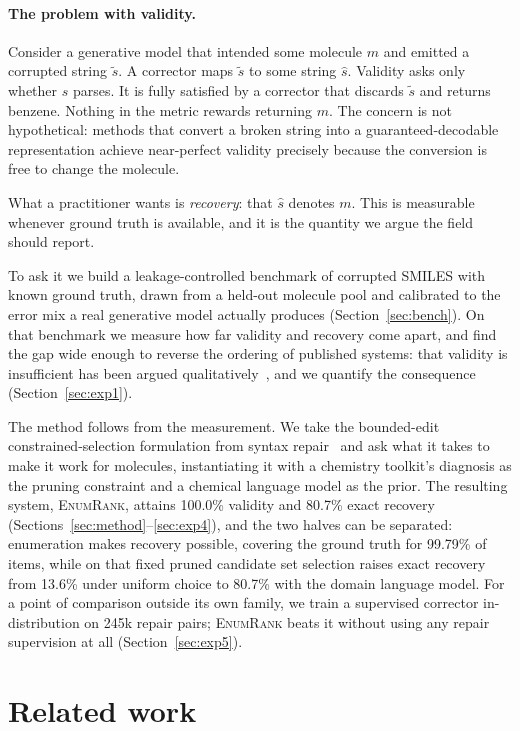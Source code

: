 \documentclass[journal=jcisd8,manuscript=article]{achemso}
\newcommand{\ours}{\textsc{EnumRank}}
\begin{document}
\paragraph{The problem with validity.}
Consider a generative model that intended some molecule $m$ and emitted a
corrupted string $\tilde{s}$. A corrector maps $\tilde{s}$ to some string
$\hat{s}$. Validity asks only whether $\hat{s}$ parses. It is fully satisfied by
a corrector that discards $\tilde{s}$ and returns benzene. Nothing in the metric
rewards returning $m$. The concern is not hypothetical: methods that convert a
broken string into a guaranteed-decodable representation achieve near-perfect
validity precisely because the conversion is free to change the molecule.

What a practitioner wants is \emph{recovery}: that $\hat{s}$ denotes $m$. This
is measurable whenever ground truth is available, and it is the quantity we
argue the field should report.

To ask it we build a leakage-controlled benchmark of corrupted SMILES with known
ground truth, drawn from a held-out molecule pool and calibrated to the error mix
a real generative model actually produces (Section~\ref{sec:bench}). On that
benchmark we measure how far validity and recovery come apart, and find the gap
wide enough to reverse the ordering of published systems: that validity is
insufficient has been argued qualitatively~\citep{amrec}, and we quantify the
consequence (Section~\ref{sec:exp1}).

The method follows from the measurement. We take the bounded-edit
constrained-selection formulation from syntax repair~\citep{considine2025syntax}
and ask what it takes to make it work for molecules, instantiating it with a
chemistry toolkit's diagnosis as the pruning constraint and a chemical language
model as the prior. The resulting system, \ours{}, attains 100.0\% validity and
80.7\% exact recovery (Sections~\ref{sec:method}--\ref{sec:exp4}), and the two
halves can be separated: enumeration makes recovery possible, covering the
ground truth for 99.79\% of items, while on that fixed pruned candidate set
selection raises exact recovery from 13.6\% under uniform choice to 80.7\% with
the domain language model. For a point of comparison outside its own family, we
train a supervised corrector in-distribution on 245k repair pairs; \ours{} beats
it without using any repair supervision at all (Section~\ref{sec:exp5}).

\section{Related work}
\end{document}
